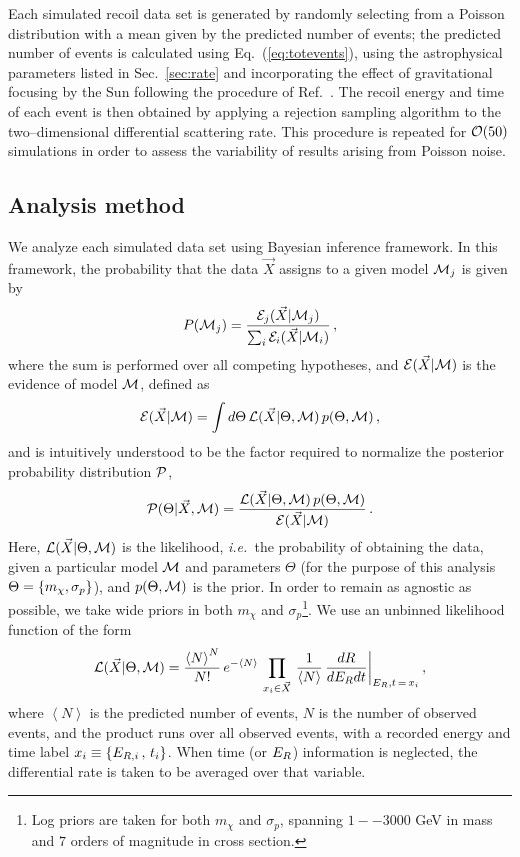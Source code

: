 \documentclass[11pt, a4paper]{article}
\newcommand{\ie}{{\it i.e.~}}  \newcommand{\eg}{{\it e.g.~}}
\newcommand{\Eq}[1]{Eq.~(\ref{#1})} \newcommand{\Eqs}[2]{Eqs.~(\ref{#1}) and (\ref{#2})} \newcommand{\Eqm}[2]{Eqs.~(\ref{#1}) through (\ref{#2})}
\newcommand{\Sec}[1]{Sec.~\ref{#1}} \newcommand{\Secs}[2]{Secs.~\ref{#1} and \ref{#2}} \newcommand{\Secm}[2]{Secs.~\ref{#1} through \ref{#2}}
\begin{document}
Each simulated recoil data set is generated by randomly selecting from a Poisson distribution with a mean given by the predicted number of events; the predicted number of events is calculated using \Eq{eq:totevents}, using the astrophysical parameters listed in \Sec{sec:rate} and incorporating the effect of gravitational focusing by the Sun following the procedure of Ref.~\cite{Lee:2013wza}. The recoil energy and time of each event is then obtained by applying a rejection sampling algorithm to the two--dimensional differential scattering rate. This procedure is repeated for ${\cal O}(50)$ simulations in order to assess the variability of results arising from Poisson noise. 

\subsection{Analysis method}\label{sec:stats}

We analyze each simulated data set using Bayesian inference framework. In this framework, the probability that the data $\vec{X}$ assigns to a given model ${\cal M}_j$ is given by
\begin{equation}\label{eq:probs}
P({\cal M}_j) = \frac{{\cal E}_j(\vec{X}|{\cal M}_j)}{\sum_i {\cal E}_i(\vec{X}|{\cal M}_i)} \, ,
\end{equation}
where the sum is performed over all competing hypotheses, and ${\cal E}(\vec{X}|{\cal M})$ is the evidence of model ${\cal M}$, defined as
\begin{equation}\label{eq:evidence}
{\cal E}(\vec{X}|{\cal M}) = \int d\Theta \, {\cal L}(\vec{X}|\Theta,{\cal M}) \, p(\Theta,{\cal M}) \, ,
\end{equation}
and is intuitively understood to be the factor required to normalize the posterior probability distribution ${ \cal P}$,
\begin{equation}\label{eq:posterior}
{ \cal P}(\Theta | \vec{X}, {\cal M}) = \frac{{\cal L}(\vec{X}|\Theta,{\cal M})\, p(\Theta,{\cal M})}{{\cal E}(\vec{X}|{\cal M})} \, . 
\end{equation}
Here, ${\cal L}(\vec{X}|\Theta,{\cal M})$ is the likelihood, \ie the probability of obtaining the data, given a particular model ${\cal M}$ and parameters $\Theta$ (for the purpose of this analysis $\Theta = \left\{ m_\chi, \sigma_p \right\}$), and $p(\Theta, {\cal M})$ is the prior. In order to remain as agnostic as possible, we take wide priors in both $m_\chi$ and $\sigma_p$\footnote{Log priors are taken for both $m_\chi$ and $\sigma_p$, spanning $1--3000$ GeV in mass and $7$ orders of magnitude in cross section.}. We use an unbinned likelihood function of the form
\begin{equation}\label{eq:likelihood}
{\cal L}(\vec{X}|\Theta,{\cal M}) = \frac{\left<N \right>^N}{N!} \, e^{-\left<N \right>} \, \prod_{x_i \in \vec{X}}\, \frac{1}{\left<N \right>} \, \frac{dR}{dE_R dt} \bigg|_{E_R,t \, = \, x_i} \, ,
\end{equation}
where $\left<N \right>$ is the predicted number of events, $N$ is the number of observed events, and the product runs over all observed events, with a recorded energy and time label $x_i \equiv \left\{ E_{R,i} \, , \, t_i \right\}$. When time (or $E_R$) information is neglected, the differential rate is taken to be averaged over that variable. 
\end{document}
